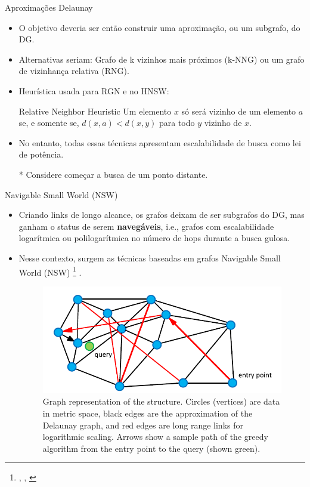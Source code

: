 \documentclass[11pt]{beamer}
\makeatletter
\renewcommand{\footfullcite}[1]{%
  \footnote{\scriptsize \citeauthor{#1}, {\color{beamer@blendedblue} \citetitle{#1}}, \citeyear{#1}}%
}
\makeatother
\begin{document}
\begin{frame}{Aproximações Delaunay}

\begin{itemize}
    \item O objetivo deveria ser então construir uma aproximação, ou um subgrafo, do DG.
    \item Alternativas seriam: Grafo de k vizinhos mais próximos (k-NNG) ou um grafo de vizinhança relativa (RNG).
    \item Heurística usada para RGN e no HNSW:

    {\small
        \begin{block}{Relative Neighbor Heuristic}
            Um elemento $x$ só será vizinho de um elemento $a$ se, e somente se, $d(x, a) < d(x, y)$ para todo $y$ vizinho de $x$.
        \end{block}
    }
    \item No entanto, todas essas técnicas apresentam escalabilidade de busca como lei de potência.

    * Considere começar a busca de um ponto distante.
\end{itemize}

\end{frame}

\begin{frame}{Navigable Small World (NSW)}

\begin{itemize}
    \item Criando links de longo alcance, os grafos deixam de ser subgrafos do DG, mas ganham o status de serem \textbf{navegáveis}, i.e., grafos com escalabilidade logarítmica ou polilogarítmica no número de hops durante a busca gulosa.
    \item Nesse contexto, surgem as técnicas baseadas em grafos Navigable Small World (NSW)\footfullcite{smallworldgraphs:malkov2014}.
    \begin{figure}
        \centering
        \includegraphics[width=0.5\linewidth]{imgs/navigablesmallworld_graph.png}
        \caption{\scriptsize Graph representation of the structure. Circles (vertices) are data in metric space, black edges are the approximation of the Delaunay graph, and red edges are long range links for logarithmic scaling. Arrows show a sample path of the greedy algorithm from the entry point to the query (shown green).}
        \label{fig:enter-label}
    \end{figure}
\end{itemize}

\end{frame}
\end{document}
